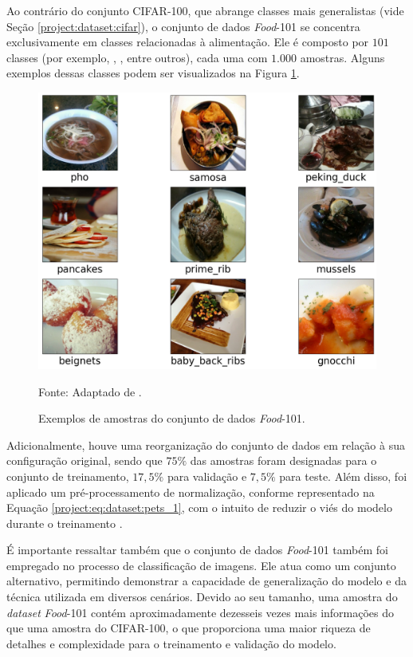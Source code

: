Ao contrário do conjunto CIFAR-100, que abrange classes mais generalistas (vide Seção \ref{project:dataset:cifar}), o conjunto de dados \textit{Food}-101 se concentra exclusivamente em classes relacionadas à alimentação. Ele é composto por $101$ classes (por exemplo, , , entre outros), cada uma com $1.000$ amostras. Alguns exemplos dessas classes podem ser visualizados na Figura \ref{project:fig:dataset:food}.

\begin{figure}[H]
    \centering
    \caption{Exemplos de amostras do conjunto de dados \textit{Food}-101.}
    \label{project:fig:dataset:food}
    \includegraphics[width=1\textwidth]{recursos/imagens/project/food101v2.png}

    Fonte: Adaptado de \cite{Bossard2014Food-101Forests}.
\end{figure}

Adicionalmente, houve uma reorganização do conjunto de dados em relação à sua configuração original, sendo que $75\%$ das amostras foram designadas para o conjunto de treinamento, $17,5\%$ para validação e $7,5\%$ para teste. Além disso, foi aplicado um pré-processamento de normalização, conforme representado na Equação \ref{project:eq:dataset:pets_1}, com o intuito de reduzir o viés do modelo durante o treinamento \citep{Shorten2019ALearning}.

É importante ressaltar também que o conjunto de dados \textit{Food}-101 também foi empregado no processo de classificação de imagens. Ele atua como um conjunto alternativo, permitindo demonstrar a capacidade de generalização do modelo e da técnica utilizada em diversos cenários. Devido ao seu tamanho, uma amostra do \textit{dataset} \textit{Food}-101 contém aproximadamente dezesseis vezes mais informações do que uma amostra do CIFAR-100, o que proporciona uma maior riqueza de detalhes e complexidade para o treinamento e validação do modelo.

